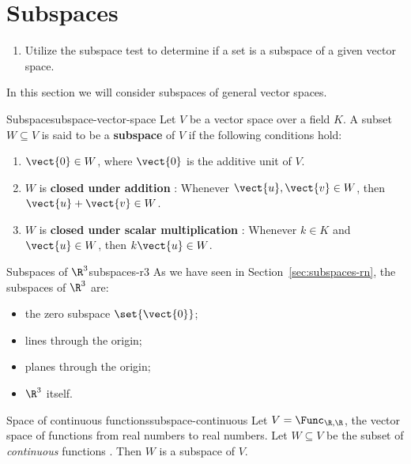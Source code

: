 \section{Subspaces}

\begin{outcome}
  \begin{enumerate}
  \item Utilize the subspace test to determine if a set is a subspace
    of a given vector space.
  \end{enumerate}
\end{outcome}

In this section we will consider subspaces of general vector spaces.

\begin{definition}{Subspace}{subspace-vector-space}
  Let $V$ be a vector space over a field $K$. A subset $W\subseteq V$
  is said to be a \textbf{subspace} of $V$ if the
  following conditions hold:
  \begin{enumerate}
  \item $\vect{0}\in W$, where $\vect{0}$ is the additive unit of $V$.
  \item $W$ is \textbf{closed under addition}%
    : Whenever $\vect{u}, \vect{v}\in W$,
    then $\vect{u} + \vect{v}\in W$.
  \item $W$ is \textbf{closed under scalar multiplication}%
    : Whenever $k\in K$ and
    $\vect{u}\in W$, then $k\vect{u}\in W$. 
  \end{enumerate}
\end{definition}

\begin{example}{Subspaces of $\R^3$}{subspaces-r3}
  As we have seen in Section~\ref{sec:subspaces-rn}, the subspaces of
  $\R^3$ are:
  \begin{itemize}
  \item the zero subspace%
     $\set{\vect{0}}$;
  \item lines through the origin;
  \item planes through the origin;
  \item $\R^3$ itself.
  \end{itemize}
\end{example}

\begin{example}{Space of continuous functions}{subspace-continuous}
  Let $V = \Func_{\R,\R}$, the vector space of functions from real numbers to
  real numbers. Let $W\subseteq V$ be the subset of {\em continuous}
  functions%
  . Then $W$ is a subspace of $V$.
\end{example}

